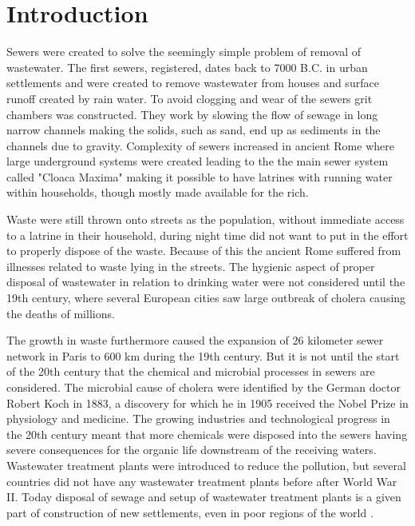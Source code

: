 \chapter{Introduction}
\label{ch:introduction}

Sewers were created to solve the seemingly simple problem of removal of wastewater. The first sewers, registered, dates back to 7000 B.C. in urban settlements and were created to remove wastewater from houses and surface runoff created by rain water. To avoid clogging and wear of the sewers grit chambers was constructed. They work by slowing the flow of sewage in long narrow channels making the solids, such as sand, end up as sediments in the channels due to gravity. Complexity of sewers increased in ancient Rome where large underground systems were created leading to the the main sewer system called "Cloaca Maxima" making it possible to have latrines with running water within households, though mostly made available for the rich.

Waste were still thrown onto streets as the population, without immediate access to a latrine in their household, during night time did not want to put in the effort to properly dispose of the waste. Because of this the ancient Rome suffered from illnesses related to waste lying in the streets. The hygienic aspect of proper disposal of wastewater in relation to drinking water were not considered until the 19th century, where several European cities saw large outbreak of cholera causing the deaths of millions. 

The growth in waste furthermore caused the expansion of 26 kilometer sewer network in Paris to 600 km during the 19th century. But it is not until the start of the 20th century that the chemical and microbial processes in sewers are considered. The microbial cause of cholera were identified by the German doctor Robert Koch in 1883, a discovery for which he in 1905 received the Nobel Prize in physiology and medicine. The growing industries and technological progress in the 20th century meant that more chemicals were disposed into the sewers having severe consequences for the organic life downstream of the receiving waters. Wastewater treatment plants were introduced to reduce the pollution, but several countries did not have any wastewater treatment plants before after World War II. Today disposal of sewage and setup of wastewater treatment plants is a given part of construction of new settlements, even in poor regions of the world \cite{Sewer_processes}.


